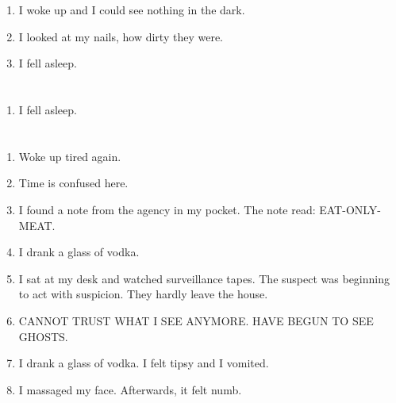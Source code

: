 \documentclass{article}
\begin{document}
    \begin{enumerate}
    
    \item I woke up and I could see nothing in the dark.\\
    
    \item I looked at my nails, how dirty they were.\\
    
    \item I fell asleep.\\
    
    \end{enumerate}
     
    \newpage
    
    \section{}
    
    \begin{enumerate}
    
    \item I fell asleep.\\
    
    \end{enumerate}
     
    \newpage
    
    \section{}
    
    \begin{enumerate}
    
    \item Woke up tired again.\\
    
    \item Time is confused here.\\
    
    \item I found a note from the agency in my pocket. The note read: EAT-ONLY-MEAT.\\
    
    \item I drank a glass of vodka.\\
    
    \item I sat at my desk and watched surveillance tapes. The suspect was beginning to act with suspicion. They hardly leave the house.\\
    
    \item CANNOT TRUST WHAT I SEE ANYMORE. HAVE BEGUN TO SEE GHOSTS.\\
    
    \item I drank a glass of vodka. I felt tipsy and I vomited.\\
    
    \item I massaged my face. Afterwards, it felt numb.\\
    
    \end{enumerate}
     
\end{document}
